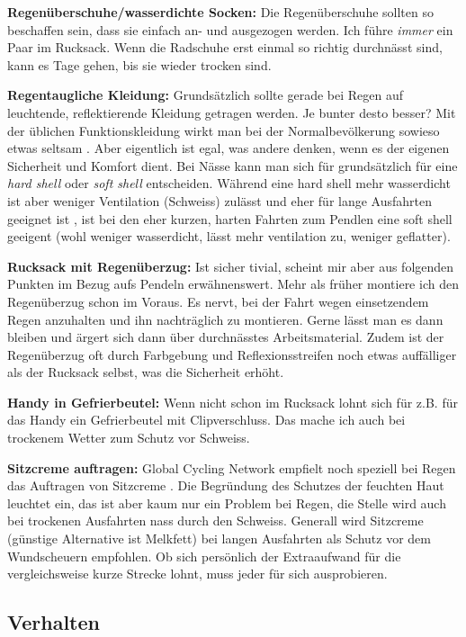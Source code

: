 \textbf{Regenüberschuhe/wasserdichte Socken:}
Die Regenüberschuhe sollten so beschaffen sein, dass sie einfach an- und ausgezogen werden.
Ich führe \emph{immer} ein Paar im Rucksack.
Wenn die Radschuhe erst einmal so richtig durchnässt sind,
kann es Tage gehen, bis sie wieder trocken sind.

\textbf{Regentaugliche Kleidung:}
Grundsätzlich sollte gerade bei Regen auf leuchtende, reflektierende Kleidung getragen werden.
Je bunter desto besser?
Mit der üblichen Funktionskleidung wirkt man bei der Normalbevölkerung sowieso etwas seltsam \cite{Rasche2016albern}.
Aber eigentlich ist egal, was andere denken, wenn es der eigenen Sicherheit und Komfort dient.
Bei Nässe kann man sich für grundsätzlich für eine \textsl{hard shell} oder \textsl{soft shell} entscheiden.
Während eine hard shell mehr wasserdicht ist aber weniger Ventilation (Schweiss) zulässt und eher für lange Ausfahrten geeignet ist \cite{gcn2015rain},
ist bei den eher kurzen, harten Fahrten zum Pendlen eine soft shell geeigent (wohl weniger wasserdicht, lässt mehr ventilation zu, weniger geflatter).

\textbf{Rucksack mit Regenüberzug:}
Ist sicher tivial, scheint mir aber aus folgenden Punkten im Bezug aufs Pendeln erwähnenswert.
Mehr als früher montiere ich den Regenüberzug schon im Voraus.
Es nervt, bei der Fahrt wegen einsetzendem Regen anzuhalten und ihn nachträglich zu montieren.
Gerne lässt man es dann bleiben und ärgert sich dann über durchnässtes Arbeitsmaterial.
Zudem ist der Regenüberzug oft durch Farbgebung und Reflexionsstreifen noch etwas auffälliger als der Rucksack selbst,
was die Sicherheit erhöht.

\textbf{Handy in Gefrierbeutel:}
Wenn nicht schon im Rucksack lohnt sich für z.B. für das Handy ein Gefrierbeutel mit Clipverschluss.
Das mache ich auch bei trockenem Wetter zum Schutz vor Schweiss.

\textbf{Sitzcreme auftragen:}
Global Cycling Network empfielt noch speziell bei Regen das Auftragen von Sitzcreme \cite{gcn2013rain,gcn2015rain}.
Die Begründung des Schutzes der feuchten Haut leuchtet ein, das ist aber kaum nur ein Problem bei Regen,
die Stelle wird auch bei trockenen Ausfahrten nass durch den Schweiss.
Generall wird Sitzcreme (günstige Alternative ist Melkfett) bei langen Ausfahrten als Schutz vor dem Wundscheuern empfohlen.
Ob sich persönlich der Extraaufwand für die vergleichsweise kurze Strecke lohnt, muss jeder für sich ausprobieren.

\subsection{Verhalten}

